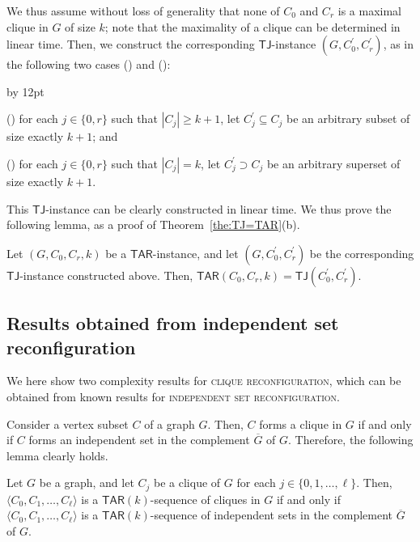 \documentclass{llncs}
\newcommand{\TAR}[1]{\mathsf{TAR}(#1)}
\newcommand{\TJ}{\mathsf{TJ}}
\newcommand{\ini}{0}
\newcommand{\tar}{r}
\newcommand{\cliq}{C}
\newcommand{\TARrule}{\mathsf{TAR}}
\newcommand{\TARins}[3]{\mathsf{TAR}(#1,#2,#3)}
\newcommand{\TJins}[2]{\mathsf{TJ}(#1,#2)}
\newenvironment{listing}[1]{\begin{list}{*}{\settowidth{\labelwidth}{#1}\setlength{\leftmargin}{\labelwidth}\advance \leftmargin by 12pt
\setlength{\itemsep}{0pt}\setlength{\parsep}{0pt}\setlength{\topsep}{0pt}\setlength{\parskip}{0pt}}}{\end{list}}
\newcounter{one}
\newcommand{\one}{{\rm \roman{one}}}
\newcounter{two}
\newcommand{\two}{{\rm \roman{two}}}
\begin{document}
	We thus assume without loss of generality that none of $\cliq_{\ini}$ and $\cliq_{\tar}$ is a maximal clique in $G$ of size $k$;
note that the maximality of a clique can be determined in linear time. 
	Then, we construct the corresponding $\TJ$-instance $(G, \cliq_{\ini}^\prime, \cliq_{\tar}^\prime)$, as in the following two cases (\one) and (\two):
	\begin{listing}{aaa}
	\item[(\one)] for each $j \in \{\ini, \tar\}$ such that $|\cliq_j| \ge k+1$, let $\cliq_j^\prime \subseteq \cliq_j$ be an arbitrary subset of size exactly $k+1$; and
	\item[(\two)] for each $j \in \{\ini, \tar\}$ such that $|\cliq_j| = k$, let $\cliq_j^\prime \supset \cliq_j$ be an arbitrary superset of size exactly $k+1$.
	\end{listing}
	This $\TJ$-instance can be clearly constructed in linear time.
	We thus prove the following lemma, as a proof of Theorem~\ref{the:TJ=TAR}(b).
	\begin{lemma} \label{lem:TJ=TARb}
	Let $(G, \cliq_{\ini}, \cliq_{\tar}, k)$ be a $\TARrule$-instance, and let $(G, \cliq_{\ini}^\prime, \cliq_{\tar}^\prime)$ be the corresponding $\TJ$-instance constructed above.
	Then, $\TARins{\cliq_{\ini}}{\cliq_{\tar}}{k} = \TJins{\cliq_{\ini}^\prime}{\cliq_{\tar}^\prime}$.
	\end{lemma}

\subsection{Results obtained from {\sc independent set reconfiguration}}
\label{subsec:independent-clique}

	We here show two complexity results for \textsc{clique reconfiguration}, which can be obtained from known results for \textsc{independent set reconfiguration}. 

	Consider a vertex subset $\cliq$ of a graph $G$. 
	Then, $\cliq$ forms a clique in $G$ if and only if $\cliq$ forms an independent set in the complement $\overline{G}$ of $G$.
	Therefore, the following lemma clearly holds.
	\begin{lemma} \label{lem:clique-independent}
	Let $G$ be a graph, and let $\cliq_{j}$ be a clique of $G$ for each $j \in \{0, 1, \ldots, \ell\}$.
	Then, $\langle \cliq_{0}, \cliq_{1}, \ldots, \cliq_{\ell} \rangle$ is a $\TAR{k}$-sequence of cliques in $G$
if and only if
$\langle \cliq_{0}, \cliq_{1}, \allowbreak \ldots, \cliq_{\ell} \rangle$ is a $\TAR{k}$-sequence of independent sets in the complement $\overline{G}$ of $G$.
	\end{lemma}
\end{document}
